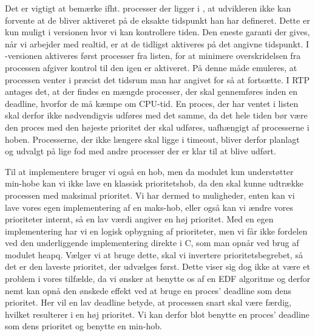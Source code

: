 Det er vigtigt at bemærke ifht. processer der ligger i , at udvikleren ikke kan forvente at de bliver aktiveret på de eksakte tidspunkt han har defineret. Dette er kun muligt i \des versionen hvor vi kan kontrollere tiden. Den eneste garanti der gives, når vi arbejder med realtid, er at de tidligst aktiveres på det angivne tidspunkt. I -versionen  aktiveres først processer fra  listen, for at minimere overskridelsen fra processen afgiver kontrol til den igen er aktiveret. På denne måde emuleres, at processen venter i præcist det tidsrum man har angivet for så at fortsætte. I RTP antages det, at der findes en mængde processer, der skal gennemføres inden en deadline, hvorfor de må kæmpe om CPU-tid. En proces, der har ventet i  listen skal derfor ikke nødvendigvis udføres med det samme, da det hele tiden bør være den proces med den højeste prioritet der skal udføres, uafhængigt af processerne i  hoben. Processerne, der ikke længere skal ligge i timeout, bliver derfor planlagt og udvalgt på lige fod med andre processer der er klar til at blive udført. 

Til at implementere  bruger vi også en hob, men da modulet  kun understøtter min-hobe kan vi ikke lave en klassisk prioritetshob, da den skal kunne udtrække processen med maksimal prioritet. Vi har dermed to muligheder, enten kan vi lave vores egen implementering af en maks-hob, eller også kan vi ændre vores prioriteter internt, så en lav værdi angiver en høj prioritet. Med en egen implementering har vi en  logisk opbygning af prioriteter, men vi får ikke fordelen ved den underliggende implementering  direkte i C, som man opnår ved brug af modulet heapq. Vælger vi at bruge dette, skal vi invertere prioritetsbegrebet, så det er den laveste prioritet, der udvælges først. Dette viser  sig dog ikke at være et problem  i vores tilfælde, da vi ønsker at benytte os af en EDF algoritme og derfor nemt kan opnå den ønskede effekt ved at bruge en proces' deadline som dens prioritet. Her vil en lav deadline betyde, at processen snart skal være færdig, hvilket resulterer i en høj prioritet.
Vi kan derfor blot benytte en proces' deadline som dens prioritet og benytte en min-hob. 


